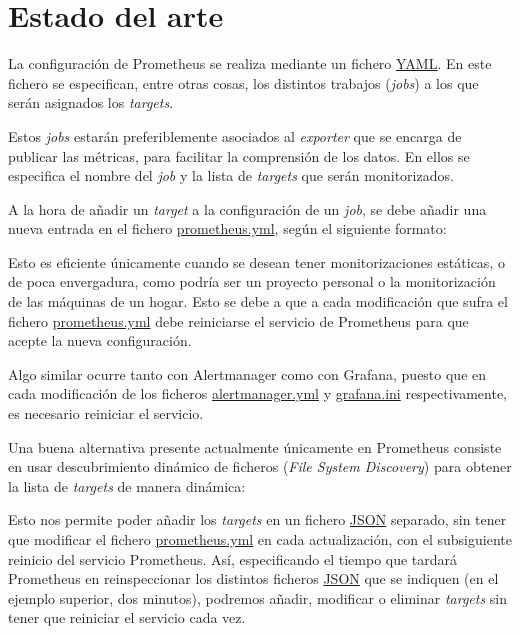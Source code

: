 \section{Estado del arte}

La configuración de Prometheus se realiza mediante un fichero \url{YAML}. En este fichero se especifican, entre otras cosas, los distintos trabajos (\textit{jobs}) a los que serán asignados los \textit{targets}. 

Estos \textit{jobs} estarán preferiblemente asociados al \textit{exporter} que se encarga de publicar las métricas, para facilitar la comprensión de los datos. En ellos se especifica el nombre del \textit{job} y la lista de \textit{targets} que serán monitorizados.

A la hora de añadir un \textit{target} a la configuración de un \textit{job}, se debe añadir una nueva entrada en el fichero \url{prometheus.yml}, según el siguiente formato:



Esto es eficiente únicamente cuando se desean tener monitorizaciones estáticas, o de poca envergadura, como podría ser un proyecto personal o la monitorización de las máquinas de un hogar. Esto se debe a que a cada modificación que sufra el fichero \url{prometheus.yml} debe reiniciarse el servicio de Prometheus para que acepte la nueva configuración.

Algo similar ocurre tanto con Alertmanager como con Grafana, puesto que en cada modificación de los ficheros \url{alertmanager.yml} y \url{grafana.ini} respectivamente, es necesario reiniciar el servicio.

Una buena alternativa presente actualmente únicamente en Prometheus consiste en usar descubrimiento dinámico de ficheros (\textit{File System Discovery}) para obtener la lista de	\textit{targets} de manera dinámica:



Esto nos permite poder añadir los \textit{targets} en un fichero \url{JSON} separado, sin tener que modificar el fichero \url{prometheus.yml} en cada actualización, con el subsiguiente reinicio del servicio Prometheus. Así, especificando el tiempo que tardará Prometheus en reinspeccionar los distintos ficheros \url{JSON} que se indiquen (en el ejemplo superior, dos minutos), podremos añadir, modificar o eliminar	\textit{targets} sin tener que reiniciar el servicio cada vez.

